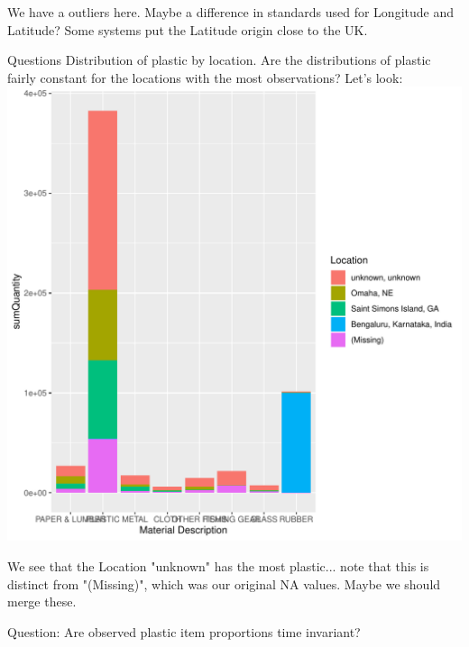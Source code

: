\documentclass[10pt]{article}\usepackage[]{graphicx}\usepackage[]{color}
\makeatletter
\def\maxwidth{ %
  \ifdim\Gin@nat@width>\linewidth
    \linewidth
  \else
    \Gin@nat@width
  \fi
}
\newenvironment{knitrout}{}{} %
\makeatother
\begin{document}
\begin{itemize}
\begin{knitrout}
\end{knitrout}
We have a outliers here. Maybe a difference in standards used for Longitude and Latitude? Some systems put the Latitude origin close to the UK.

Questions
Distribution of plastic by location.
Are the distributions of plastic fairly constant for the locations with the most observations? Let's look:
\begin{knitrout}
\color{fgcolor}
\includegraphics[width=\maxwidth]{figure/unnamed-chunk-18-1} 

\end{knitrout}
We see that the Location "unknown" has the most plastic... note that this is distinct from "(Missing)", which was our original NA values. Maybe we should merge these.

Question: Are observed plastic item proportions time invariant?


\end{itemize}
\end{document}
